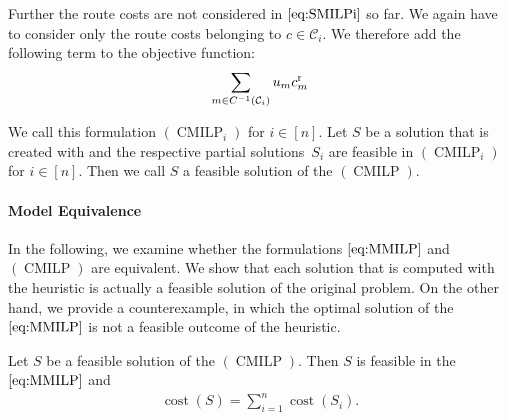 Further the route costs are not considered in $\eqref{eq:SMILPi}$ so far. We again have to consider only the route costs belonging to $c\in\mathcal{C}_i$. We therefore add the following term to the objective function:
\begin{align*}
	\sum_{m\in C^{-1}\left(\mathcal{C}_i\right)} u_m c^{\operatorname{r}}_m
\end{align*}

We call this formulation $(\operatorname{CMILP}_i)$ for $i\in[n]$. Let $S$ be a solution that is created with  and the respective partial solutions~$S_i$ are feasible in $(\operatorname{CMILP}_i)$ for ${i\in[n]}$. Then we call $S$ a feasible solution of the $(\operatorname{CMILP})$.

\paragraph{Model Equivalence} \parfill

In the following, we examine whether the formulations $\eqref{eq:MMILP}$ and $(\operatorname{CMILP})$ are equivalent. We show that each solution that is computed with the heuristic is actually a feasible solution of the original problem. On the other hand, we provide a counterexample, in which the optimal solution of the $\eqref{eq:MMILP}$ is not a feasible outcome of the heuristic.

\begin{theorem}
\label{thm:equivalence_CMILP_MMILP}

Let $S$ be a feasible solution of the $(\operatorname{CMILP})$. Then $S$ is feasible in the $\eqref{eq:MMILP}$ and
\begin{align*}
	\operatorname{cost}\left(S\right) = \sum_{i=1}^n\operatorname{cost}\left(S_i\right).
\end{align*}

\end{theorem}

